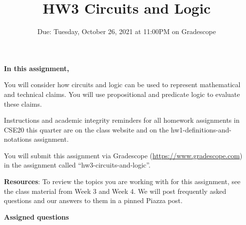 

\title{HW3 Circuits and Logic}
\date{Due: Tuesday, October 26, 2021 at 11:00PM on Gradescope}


\maketitle
\thispagestyle{fancy}

{\bf In this assignment,}

You will consider how circuits and logic can be used to represent
mathematical and technical claims. You will use propositional 
and predicate logic to evaluate these claims.

Instructions and academic integrity reminders for all homework assignments in 
CSE20 this quarter are on the class website and on the hw1-definitions-and-notations
assignment.

You will submit this assignment via Gradescope
(\href{https://www.gradescope.com}{https://www.gradescope.com}) 
in the assignment called ``hw3-circuits-and-logic''.

{\bf Resources}: To review the topics you are working with 
for this assignment, see the class material from Week 3 and Week 4.
We will post frequently asked questions and our answers to them in a 
pinned Piazza post.

{\bf Assigned questions}

